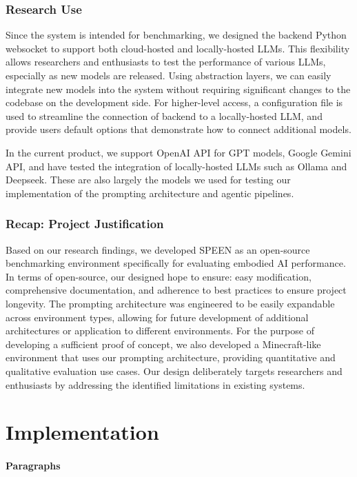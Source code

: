 \documentclass{article}
\begin{document}
\subsubsection{Research Use}
Since the system is intended for benchmarking, we designed the backend Python websocket to support both cloud-hosted and locally-hosted LLMs.
This flexibility allows researchers and enthusiasts to test the performance of various LLMs, especially as new models are released.
Using abstraction layers, we can easily integrate new models into the system without requiring significant changes to the codebase on the development side.
For higher-level access, a configuration file is used to streamline the connection of backend to a locally-hosted LLM, and provide users default options that demonstrate how to connect additional models.

In the current product, we support OpenAI API for GPT models, Google Gemini API, and have tested the integration of locally-hosted LLMs such as Ollama and Deepseek.
These are also largely the models we used for testing our implementation of the prompting architecture and agentic pipelines.

\subsubsection{Recap: Project Justification}
Based on our research findings, we developed SPEEN as an open-source benchmarking environment specifically for evaluating embodied AI performance.
In terms of open-source, our designed hope to ensure: easy modification, comprehensive documentation, and adherence to best practices to ensure project longevity.
The prompting architecture was engineered to be easily expandable across environment types, allowing for future development of additional architectures or application to different environments.
For the purpose of developing a sufficient proof of concept, we also developed a Minecraft-like environment that uses our prompting architecture, providing quantitative and qualitative evaluation use cases.
Our design deliberately targets researchers and enthusiasts by addressing the identified limitations in existing systems.

\section{Implementation}

\paragraph{Paragraphs}
\end{document}
